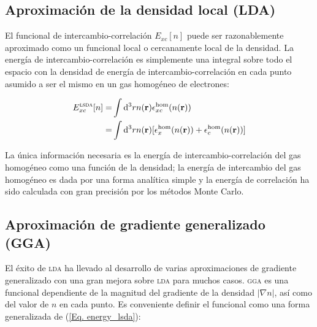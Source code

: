 
\subsection{Aproximación de la densidad local (LDA)}

El funcional de intercambio-correlación $E_{xc}[n]$ puede ser razonablemente aproximado como un funcional local o cercanamente local de la densidad. La energía de intercambio-correlación es simplemente una integral sobre todo el espacio con la densidad de energía de intercambio-correlación en cada punto asumido a ser el mismo en un gas homogéneo de electrones:

\begin{equation}
    \begin{split}
        E_{xc}^{\textsc{lsda}}[n]=&\int\mathrm{d}^{3}rn(\vec{r})\epsilon_{xc}^{\text{hom}}(n(\vec{r}))\\
        =&\int\mathrm{d}^{3}rn(\vec{r})[\epsilon_{x}^\text{hom}(n(\vec{r}))+\epsilon_{c}^\text{hom}(n(\vec{r}))]
    \end{split}
    \label{Eq. energy_lsda}
\end{equation}

La única información necesaria es la energía de intercambio-correlación del gas homogéneo como una función de la densidad; la energía de intercambio del gas homogéneo es dada por una forma analítica simple y la energía de correlación ha sido calculada con gran precisión por los métodos Monte Carlo\cite{Ceperley1980GroundMethod}.

\subsection{Aproximación de gradiente generalizado (GGA)}

El éxito de \textsc{lda} ha llevado al desarrollo de varias aproximaciones de gradiente generalizado con una gran mejora sobre \textsc{lda} para muchos casos. \textsc{gga}\cite{Perdew1996ComparisonFunctional} es una funcional dependiente de la magnitud del gradiente de la densidad $|\nabla n|$, así como del valor de $n$ en cada punto. Es conveniente definir el funcional como una forma generalizada de (\ref{Eq. energy_lsda}):

